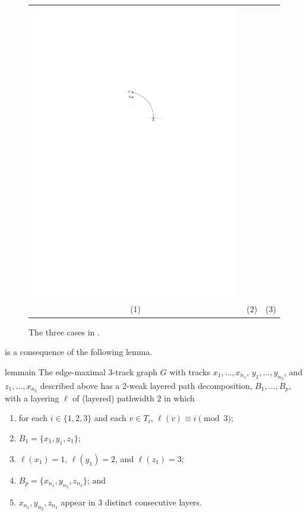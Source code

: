 \documentclass{patmorin}
\begin{document}
\begin{figure}
\begin{center}
\begin{tabular}{ccc}
       \includegraphics{figs/silly-3} \\
       (1) & (2) & (3) 
     \end{tabular}
   \end{center}
   \caption{The three cases in .}
\end{figure}


 is a consequence of the following lemma.

\begin{restatable}{lem}{main}
  The edge-maximal 3-track graph $G$ with tracks $x_1,\ldots,x_{n_1}$, $y_1,\ldots,y_{n_2}$, and $z_1,\ldots,x_{n_3}$ described above has a 2-weak layered path
  decomposition, $B_1,\ldots,B_p$, with a layering $\ell$ of (layered) pathwidth $2$ in which 
  \begin{enumerate}
    \item for each $i\in\{1,2,3\}$ and each $v\in T_i$,
      $\ell(v)\equiv i\pmod 3$;
    \item $B_1=\{x_1,y_1,z_1\}$;
    \item $\ell(x_1)=1$, $\ell(y_1)=2$, and $\ell(z_1)=3$;
    \item $B_p=\{x_{n_1},y_{n_2},z_{n_3}\}$; and
    \item $x_{n_1},y_{n_2},z_{n_3}$ appear in 3 distinct consecutive layers.
  \end{enumerate}
\end{restatable}
\end{document}
